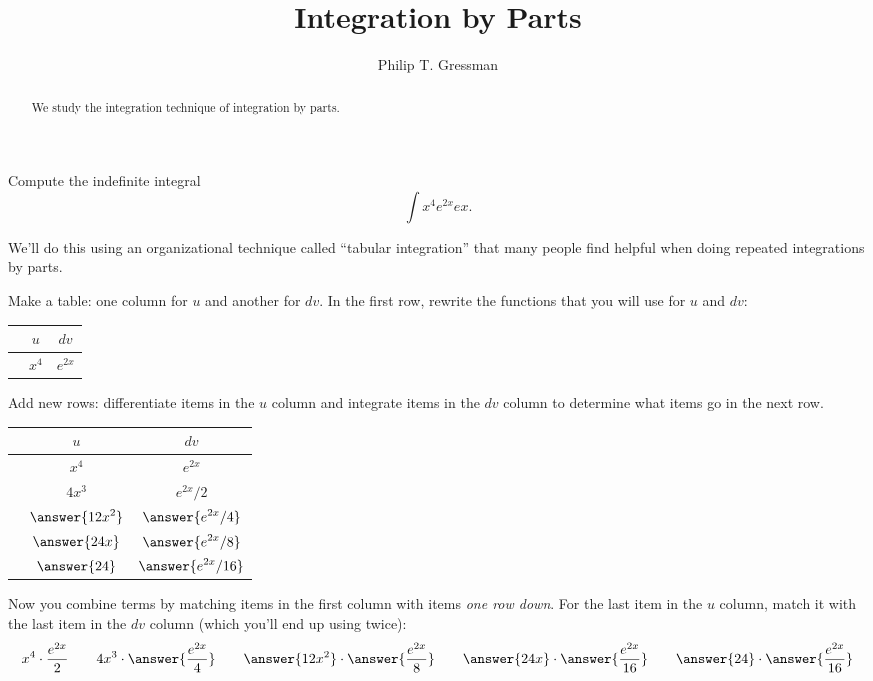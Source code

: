 \documentclass{ximera}
\title{Integration by Parts}
\author{Philip T. Gressman}
\begin{document}
\begin{abstract}
We study the integration technique of integration by parts.
\end{abstract}
\maketitle

\begin{example}
Compute the indefinite integral
\[ \int x^4 e^{2x} ex. \]
\begin{itemize}
\item We'll do this using an organizational technique called ``tabular integration'' that many people find helpful when doing repeated integrations by parts.
\item Make a table: one column for $u$ and another for $dv$. In the first row, rewrite the functions that you will use for $u$ and $dv$:
\begin{center}
\begin{tabular}{ccc}
 & $u$ & $dv$ \\
 \hline
& $\displaystyle x^4$ & $\displaystyle e^{2x}$ 
\end{tabular}
\end{center}
\item Add new rows: differentiate items in the $u$ column and integrate items in the $dv$ column to determine what items go in the next row. 
\begin{center}
\begin{tabular}{ccc}
 & $u$ & $dv$ \\
 \hline
& $\displaystyle x^4$ & $\displaystyle e^{2x}$ \\
& $\displaystyle 4 x^3$ & $\displaystyle e^{2x}/2$ \\
& $\displaystyle \answer{12 x^2}$ & $\displaystyle \answer{e^{2x}/4}$ \\
& $\displaystyle \answer{24 x}$ & $\displaystyle \answer{e^{2x}/8}$ \\
& $\displaystyle \answer{24}$ & $\displaystyle  \answer{e^{2x}/16}$ \\
\end{tabular}
\item Now you combine terms by matching items in the first column with items \textit{one row down}. For the last item in the $u$ column, match it with the last item in the $dv$ column (which you'll end up using twice):
\[ x^4 \cdot \frac{e^{2x}}{2} \qquad {4 x^3} \cdot \answer{\frac{e^{2x}}{4}} \qquad \answer{12 x^2} \cdot \answer{\frac{e^{2x}}{8}} \qquad \answer{24 x} \cdot \answer{\frac{e^{2x}}{16}} \qquad \answer{24} \cdot \answer{\frac{e^{2x}}{16}} \]

\end{center}
\end{itemize}
\end{example}
\end{document}
